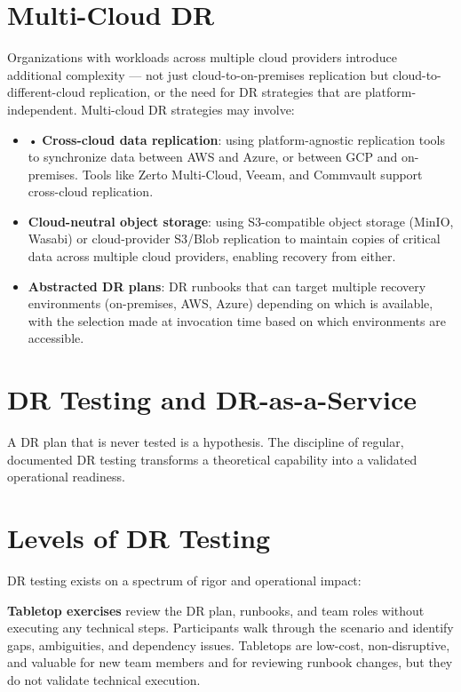 \section{Multi-Cloud DR}
Organizations with workloads across multiple cloud providers introduce additional complexity --- not just cloud-to-on-premises replication but cloud-to-different-cloud replication, or the need for DR strategies that are platform-independent. Multi-cloud DR strategies may involve:

\begin{itemize}
  \item • \textbf{Cross-cloud data replication}: using platform-agnostic replication tools to synchronize data between AWS and Azure, or between GCP and on-premises. Tools like Zerto Multi-Cloud, Veeam, and Commvault support cross-cloud replication.
  \item \textbf{Cloud-neutral object storage}: using S3-compatible object storage (MinIO, Wasabi) or cloud-provider S3/Blob replication to maintain copies of critical data across multiple cloud providers, enabling recovery from either.
  \item \textbf{Abstracted DR plans}: DR runbooks that can target multiple recovery environments (on-premises, AWS, Azure) depending on which is available, with the selection made at invocation time based on which environments are accessible.
\end{itemize}

\section{DR Testing and DR-as-a-Service}
A DR plan that is never tested is a hypothesis. The discipline of regular, documented DR testing transforms a theoretical capability into a validated operational readiness.

\section{Levels of DR Testing}
DR testing exists on a spectrum of rigor and operational impact:

\textbf{Tabletop exercises} review the DR plan, runbooks, and team roles without executing any technical steps. Participants walk through the scenario and identify gaps, ambiguities, and dependency issues. Tabletops are low-cost, non-disruptive, and valuable for new team members and for reviewing runbook changes, but they do not validate technical execution.


